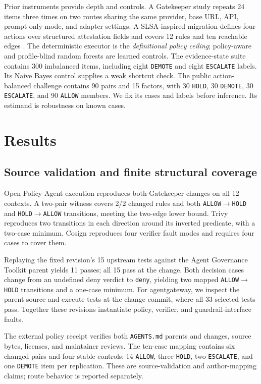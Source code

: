 \documentclass[10pt]{article}
\newcommand{\allow}{\texttt{ALLOW}}
\newcommand{\hold}{\texttt{HOLD}}
\newcommand{\demote}{\texttt{DEMOTE}}
\newcommand{\escalate}{\texttt{ESCALATE}}
\begin{document}
Prior instruments provide depth and controls. A Gatekeeper study repeats 24 items three times on
two routes sharing the same provider, base URL, API, prompt-only mode, and adapter settings. A
SLSA-inspired migration defines four actions over structured attestation fields and covers 12 rules
and ten reachable edges \cite{slsa2026v12,intoto2026attestation}. The deterministic executor is the
\emph{definitional policy ceiling}; policy-aware and profile-blind random forests are learned
controls. The evidence-state suite contains 300 imbalanced items, including eight \demote{} and
eight \escalate{} labels. Its Naive Bayes control supplies a weak shortcut check. The public
action-balanced challenge contains 90 pairs and 15 factors, with 30 \hold, 30 \demote, 30
\escalate, and 90 \allow{} members. We fix its cases and labels before inference. Its estimand is
robustness on known cases.

\section{Results}

\subsection{Source validation and finite structural coverage}

Open Policy Agent execution reproduces both Gatekeeper changes on all 12 contexts. A two-pair
witness covers 2/2 changed rules and both \allow$\rightarrow$\hold{} and
\hold$\rightarrow$\allow{} transitions, meeting the two-edge lower bound. Trivy reproduces two
transitions in each direction around its inverted predicate, with a two-case minimum. Cosign
reproduces four verifier fault modes and requires four cases to cover them.

Replaying the fixed revision's 15 upstream tests against the Agent Governance Toolkit parent yields
11 passes; all 15 pass at the change. Both decision cases change from an undefined deny verdict to \texttt{deny}, yielding two
mapped \allow$\rightarrow$\hold{} transitions and a one-case minimum. For agentgateway, we inspect
the parent source and execute tests at the change commit, where all 33 selected tests pass. Together
these revisions instantiate policy, verifier, and guardrail-interface faults.

The external policy receipt verifies both \texttt{AGENTS.md} parents and changes, source bytes,
licenses, and maintainer reviews. The ten-case mapping contains six changed pairs and four stable
controls: 14 \allow, three \hold, two \escalate, and one \demote{} item per replication. These are
source-validation and author-mapping claims; route behavior is reported separately.
\end{document}
